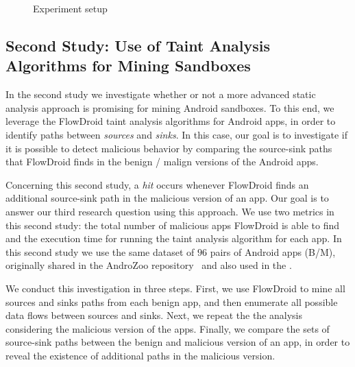 \begin{figure}[ht]
   \label{Experiment setup}
   \caption{Experiment setup}
   \label{fig:setup}
 \end{figure}

\subsection{Second Study: Use of Taint Analysis Algorithms for Mining Sandboxes}\label{sec:set2}

In the second study 
we investigate whether or not a more advanced static analysis approach is promising for
mining Android sandboxes. To this end, we leverage the FlowDroid
taint analysis algorithms for Android apps, in order to identify paths between
\emph{sources} and \emph{sinks}. In this case,
our goal is to investigate if it is possible to detect malicious
behavior by comparing the source-sink paths that FlowDroid finds in the
benign / malign versions of the Android apps.

Concerning this second study, a \emph{hit} occurs whenever
FlowDroid finds an additional source-sink path in the malicious version of an app.
Our goal is to answer our third research question using this approach. We use two metrics in this second study:
the total number of malicious apps FlowDroid is able to find and the
execution time for running the taint analysis algorithm for each app.
In this second study we use the same dataset of $96$ pairs of Android apps (B/M),
originally shared in the AndroZoo repository~\cite{DBLP:conf/msr/AllixBKT16} and
also used in the \blls. 


We conduct this investigation in three steps. First, we use
FlowDroid to mine all sources and sinks paths from each benign app, and then enumerate all possible data flows between sources
and sinks. Next, we repeat the the analysis considering the malicious version
of the apps. Finally, we compare the sets of source-sink paths between the benign and malicious
version of an app, in order to reveal the existence of additional paths in the
malicious version. 







